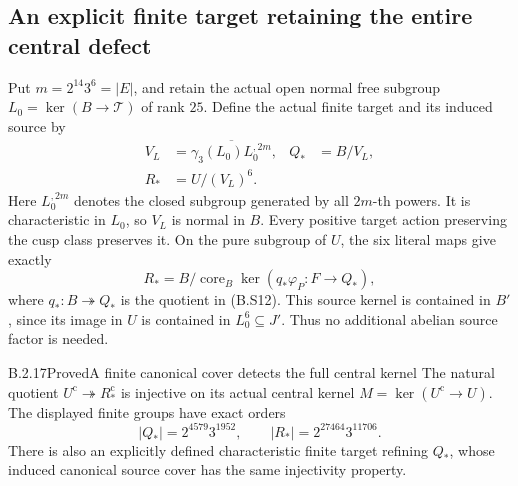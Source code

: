 \subsection{An explicit finite target retaining the entire central defect}

Put $m=2^{14}3^6=|E|$, and retain the actual open normal
free subgroup $L_0=\ker(B\to\mathcal T)$ of rank $25$.
Define the actual finite target and its induced source by
\[
\begin{aligned}
 V_L&=\overline{\gamma_3(L_0)L_0^{,2m}},&
 Q_*&=B/V_L,\\
 R_*&=U/(V_L)^6.&
\end{aligned}                                                   \tag{B.S12}
\]
Here $L_0^{,2m}$ denotes the closed subgroup generated
by all $2m$-th powers.  It is characteristic in $L_0$,
so $V_L$ is normal in $B$.  Every positive target action
preserving the cusp class preserves it.  On the pure
subgroup of $U$, the six literal maps give exactly
\[
 R_*=B/\operatorname{core}_B
             \ker(q_*\varphi_P:F\longrightarrow Q_*),           \tag{B.S13}
\]
where $q_*:B\twoheadrightarrow Q_*$ is the quotient in
(B.S12).  This source kernel is contained in $B'$,
since its image in $U$ is contained in $L_0^6\subseteq J'$.
Thus no additional abelian source factor is needed.

\begin{result}{B.2.17}{Proved}{A finite canonical cover detects the full central kernel}
The natural quotient $U^{\mathrm c}\twoheadrightarrow
R_*^{\mathrm c}$ is injective on its actual central
kernel $M=\ker(U^{\mathrm c}\to U)$.  The displayed finite
groups have exact orders
\[
 |Q_*|=2^{4579}3^{1952},\qquad
 |R_*|=2^{27464}3^{11706}.                                      \tag{B.S14}
\]
There is also an explicitly defined characteristic finite
target refining $Q_*$, whose induced canonical source
cover has the same injectivity property.
\end{result}

